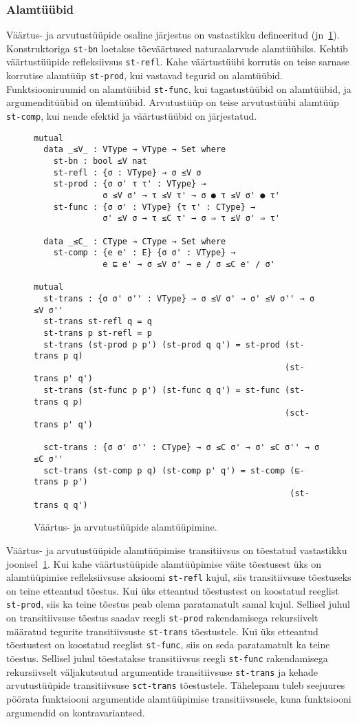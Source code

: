 \documentclass[a4paper,12pt]{article}
\begin{document}
\subsubsection{Alamtüübid}\label{ssec:exc.subtypes}
Väärtus- ja arvutustüüpide osaline järjestus on vastastikku defineeritud (jn~\ref{fig:exc.subtypes}).
Konstruktoriga {\tt st-bn} loetakse tõeväärtused naturaalarvude alamtüübiks.
Kehtib väärtustüüpide refleksiivsus {\tt st-refl}.
Kahe väärtustüübi korrutis on teise sarnase korrutise alamtüüp {\tt st-prod}, kui vastavad tegurid on alamtüübid.
Funktsiooniruumid on alamtüübid {\tt st-func}, kui tagastustüübid on alamtüübid,
ja argumenditüübid on ülemtüübid.
Arvutustüüp on teise arvutustüübi alamtüüp {\tt st-comp}, kui nende efektid ja väärtustüübid on järjestatud.
\begin{figure}
  \begin{BVerbatim}
mutual
  data _≤V_ : VType → VType → Set where
    st-bn : bool ≤V nat
    st-refl : {σ : VType} → σ ≤V σ
    st-prod : {σ σ' τ τ' : VType} →
              σ ≤V σ' → τ ≤V τ' → σ ● τ ≤V σ' ● τ'
    st-func : {σ σ' : VType} {τ τ' : CType} →
              σ' ≤V σ → τ ≤C τ' → σ ⇒ τ ≤V σ' ⇒ τ'

  data _≤C_ : CType → CType → Set where
    st-comp : {e e' : E} {σ σ' : VType} →
              e ⊑ e' → σ ≤V σ' → e / σ ≤C e' / σ'

mutual
  st-trans : {σ σ' σ'' : VType} → σ ≤V σ' → σ' ≤V σ'' → σ ≤V σ''
  st-trans st-refl q = q
  st-trans p st-refl = p
  st-trans (st-prod p p') (st-prod q q') = st-prod (st-trans p q)
                                                   (st-trans p' q')
  st-trans (st-func p p') (st-func q q') = st-func (st-trans q p)
                                                   (sct-trans p' q')

  sct-trans : {σ σ' σ'' : CType} → σ ≤C σ' → σ' ≤C σ'' → σ ≤C σ''
  sct-trans (st-comp p q) (st-comp p' q') = st-comp (⊑-trans p p')
                                                    (st-trans q q')
  \end{BVerbatim}
  \caption{Väärtus- ja arvutustüüpide alamtüüpimine.}
  \label{fig:exc.subtypes}
\end{figure}

Väärtus- ja arvutustüüpide alamtüüpimise transitiivsus on tõestatud vastastikku joonisel~\ref{fig:exc.subtypes}.
Kui kahe väärtustüüpide alamtüüpimise väite tõestusest üks on alamtüüpimise refleksiivsuse aksioomi {\tt st-refl} kujul, siis transitiivsuse tõestuseks on teine etteantud tõestus.
Kui üks etteantud tõestustest on koostatud reeglist {\tt st-prod},
siis ka teine tõestus peab olema paratamatult samal kujul.
Sellisel juhul on transitiivsuse tõestus saadav reegli {\tt st-prod} rakendamisega rekursiivelt määratud tegurite transitiivsuste {\tt st-trans} tõestustele.
Kui üks etteantud tõestustest on koostatud reeglist {\tt st-func},
siis on seda paratamatult ka teine tõestus.
Sellisel juhul tõestatakse transitiivsus reegli {\tt st-func} rakendamisega rekursiivselt väljakutsutud argumentide transitiivsuse {\tt st-trans} ja kehade arvutustüüpide transitiivsuse {\tt sct-trans} tõestustele.
Tähelepanu tuleb seejuures pöörata funktsiooni argumentide alamtüüpimise transitiivsusele, kuna funktsiooni argumendid on kontravariantsed.
\end{document}
